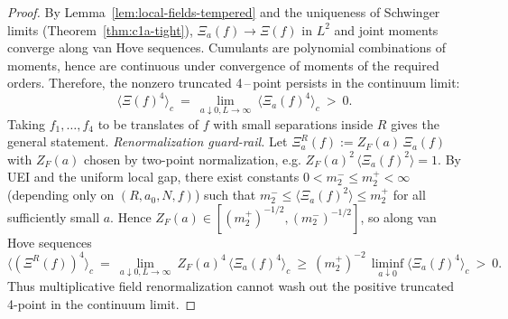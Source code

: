 \documentclass[11pt]{amsart}
\theoremstyle{plain}
\theoremstyle{definition}
\theoremstyle{remark}
\begin{document}
\begin{proof}
By Lemma~\ref{lem:local-fields-tempered} and the uniqueness of Schwinger limits (Theorem~\ref{thm:c1a-tight}), $\Xi_a(f)\to \Xi(f)$ in $L^2$ and joint moments converge along van Hove sequences. Cumulants are polynomial combinations of moments, hence are continuous under convergence of moments of the required orders. Therefore, the nonzero truncated 4\,–\,point persists in the continuum limit:
\[
  \langle \Xi(f)^4\rangle_c\ =\ \lim_{a\downarrow 0,L\to\infty}\ \langle \Xi_a(f)^4\rangle_c\ >\ 0.
\]
Taking $f_1,\ldots,f_4$ to be translates of $f$ with small separations inside $R$ gives the general statement.
\smallskip
\noindent\emph{Renormalization guard-rail.} Let $\Xi_a^R(f):=Z_F(a)\,\Xi_a(f)$ with $Z_F(a)$ chosen by two-point normalization, e.g. $Z_F(a)^2\,\langle \Xi_a(f)^2\rangle=1$. By UEI and the uniform local gap, there exist constants $0<m_2^-\le m_2^+<\infty$ (depending only on $(R,a_0,N,f)$) such that $m_2^-\le \langle \Xi_a(f)^2\rangle\le m_2^+$ for all sufficiently small $a$. Hence $Z_F(a)\in[(m_2^+)^{-1/2},(m_2^-)^{-1/2}]$, so along van Hove sequences
\[
  \langle (\Xi^R(f))^4\rangle_c\ =\ \lim_{a\downarrow 0,L\to\infty}\ Z_F(a)^4\,\langle \Xi_a(f)^4\rangle_c\ \ge\ (m_2^+)^{-2}\,\liminf_{a\downarrow 0}\langle \Xi_a(f)^4\rangle_c\ >\ 0.
\]
Thus multiplicative field renormalization cannot wash out the positive truncated 4-point in the continuum limit.
\end{proof}
\end{document}
